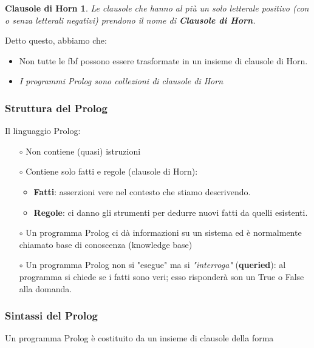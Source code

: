\documentclass[11pt]{article}
\newtheorem{horn}{Clausole di Horn}
\begin{document}
\begin{horn}
\label{thm:horn}
Le clausole che hanno al più un solo letterale positivo (con o senza letterali negativi) prendono il nome di \textbf{\emph{Clausole di Horn}}.
\end{horn}
Detto questo, abbiamo che:
\begin{itemize}
	\item Non tutte le fbf possono essere trasformate in un insieme di clausole di Horn.
	\item \textit{I programmi Prolog sono collezioni di clausole di Horn}
\end{itemize}

\subsubsection{Struttura del Prolog}
Il linguaggio Prolog:
\begin{itemize}
	\item[$\circ$]Non contiene (quasi) istruzioni
	\item[$\circ$]Contiene solo fatti e regole (clausole di Horn):
	\begin{itemize}
		\item \textbf{Fatti}: asserzioni vere nel contesto che stiamo descrivendo.
		\item \textbf{Regole}: ci danno gli strumenti per dedurre nuovi fatti da quelli esistenti.
	\end{itemize}
	\item[$\circ$]Un programma Prolog ci dà informazioni su un sistema ed è normalmente chiamato \color{red}base di conoscenza \color{black}(\color{red}knowledge base\color{black})
	\item[$\circ$]Un programma Prolog non si "esegue" ma si \textit{"interroga"} (\textbf{queried}): al programma si chiede se i fatti sono veri; esso risponderà son un \color{blue}True \color{black} o \color{blue}False \color{black} alla domanda.
\end{itemize}

\subsubsection{Sintassi del Prolog}
Un programma Prolog è costituito da un insieme di clausole della forma
\end{document}
